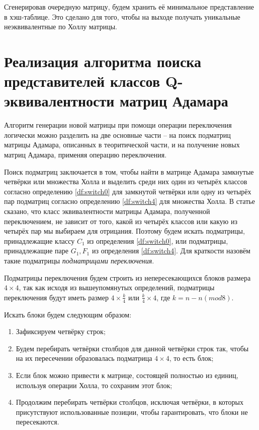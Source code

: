Сгенерировав очередную матрицу, будем хранить её минимальное представление в хэш-таблице. Это сделано для того, чтобы на выходе получать уникальные неэквивалентные по Холлу матрицы.

\section{Реализация алгоритма поиска представителей классов Q-эквивалентности матриц Адамара}

Алгоритм генерации новой матрицы при помощи операции переключения логически можно разделить на две основные части -- на поиск подматриц матрицы Адамара, описанных в теоритической части, и на получение новых матриц Адамара, применяя операцию переключения.

Поиск подматриц заключается в том, чтобы найти в матрице Адамара замкнутые четвёрки или множества Холла и выделить среди них один из четырёх классов согласно определению \ref{df:switch0} для замкнутой четвёрки или одну из четырёх пар подматриц согласно определению \ref{df:switch4} для множества Холла. В статье \cite{orrick:so} сказано, что класс эквивалентности матрицы Адамара, полученной переключением, не зависит от того, какой из четырёх классов или какую из четырёх пар мы выбираем для отрицания. Поэтому будем искать подматрицы, принадлежащие классу $C_1$ из определения \ref{df:switch0}, или подматрицы, принадлежащие паре $G_1, F_1$ из определения \ref{df:switch4}. Для краткости назовём такие подматрицы {\it подматрицами переключения}.


Подматрицы переключения будем строить из непересекающихся блоков размера $4 \times 4$, так как исходя из вышеупомянутых определений, подматрицы переключения будут иметь размер $4 \times \frac{k}{4}$ или $\frac{k}{4} \times 4$, где $k = n - n(mod8)$.

Искать блоки будем следующим образом:
\begin{enumerate}
    \item Зафиксируем четвёрку строк;
    \item Будем перебирать четвёрки столбцов для данной четвёрки строк так, чтобы на их пересечении образовалась подматрица $4 \times 4$, то есть блок;
    \item Если блок можно привести к матрице, состоящей полностью из единиц, используя операции Холла, то сохраним этот блок;
    \item Продолжим перебирать четвёрки столбцов, исключая четвёрки, в которых присутствуют использованные позиции, чтобы гарантировать, что блоки не пересекаются.
\end{enumerate}


